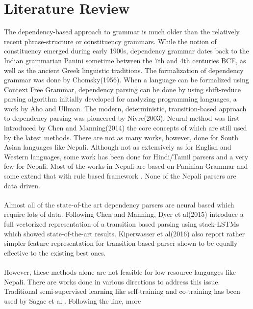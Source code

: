\chapter{Literature Review}
The dependency-based approach to grammar is much older than the relatively
recent phrase-structure or constituency grammars. While the notion of
constituency emerged during early 1900s, dependency grammar dates back to the
Indian grammarian Panini sometime between the 7th and 4th centuries BCE, as
well as the ancient Greek linguistic traditions\cite{stanfordLec}. The
formalization of dependency grammar was done by Chomsky(1956)\cite{chomsky}.
When a language can be formalized using Context Free Grammar, dependency
parsing can be done by using shift-reduce parsing algorithm initially developed
for analyzing programming languages, a work by Aho and Ullman\cite{ullman}. The
modern, deterministic, transition-based approach to dependency parsing was
pioneered by Nivre(2003)\cite{nivre1}. Neural method was first introduced by
Chen and Manning(2014)\cite{chen} the core concepts of which are still used by
the latest methods.
\newline
\newline
There are not as many works, however, done for South Asian languages like
Nepali. Although not as extensively as for English and Western languages, some
work has been done for Hindi/Tamil parsers \cite{tamilDep} and a very few for
Nepali.  Most of the works in Nepali are based on Paninian Grammar
\cite{paninianEng,yajnik1,yajnik2} and some extend that with rule based
framework \cite{balCompGrammar}. None of the Nepali parsers are data driven.
\\~\\
Almost all of the state-of-the art dependency parsers are neural based which
require lots of data. Following Chen and Manning\cite{chen}, Dyer et
al(2015)\cite{stackLstm} introduce a full vectorized representation of a
transition based parsing using stack-LSTMs which showed state-of-the-art
results.  Kiperwasser et al(2016)\cite{bistParser} also report rather simpler
feature representation for transition-based parser shown to be equally
effective to the existing best ones.
\\~\\
However, these methods alone are not feasible for low resource languages like
Nepali. There are works done in various directions to address this issue.
Traditional semi-supervised learning like self-training and co-training has
been used by Sagae et al \cite{semiSupervised1}. Following the line, more
